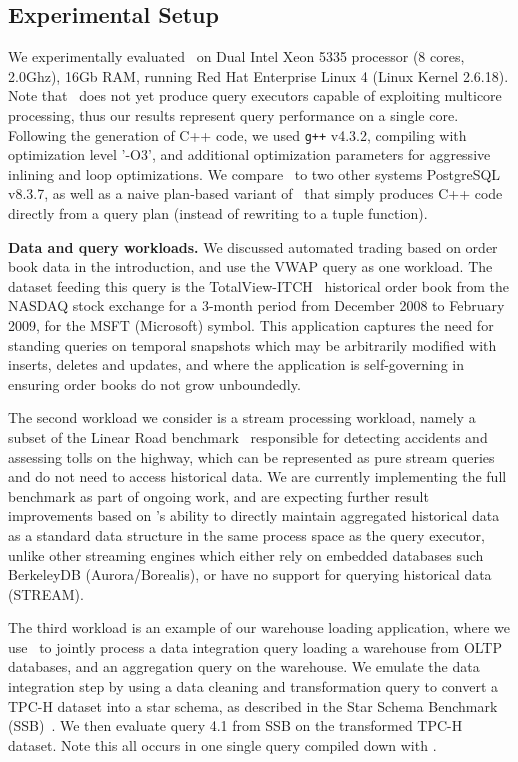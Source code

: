 \subsection{Experimental Setup}
We experimentally evaluated \compiler\ on Dual Intel Xeon 5335 processor (8
cores, 2.0Ghz), 16Gb RAM, running Red Hat Enterprise Linux 4 (Linux Kernel
2.6.18). Note that \compiler\ does not yet produce query executors capable of
exploiting multicore processing, thus our results represent query performance on
a single core. Following the generation of C++ code, we used \texttt{g++} v4.3.2,
compiling with optimization level '-O3', and additional optimization parameters
for aggressive inlining and loop optimizations. We compare \compiler\ to two
other systems PostgreSQL v8.3.7, as well as a naive plan-based variant of
\compiler\ that simply produces C++ code directly from a query plan (instead of
rewriting to a tuple function).

\textbf{Data and query workloads.}
We discussed automated trading based on order book data in the introduction, and
use the VWAP query as one workload. The dataset feeding this query is the
TotalView-ITCH~\cite{totalview-url} historical order book from the NASDAQ stock
exchange for a 3-month period from December 2008 to February 2009, for the MSFT
(Microsoft) symbol. This application captures the need for standing queries on
temporal snapshots which may be arbitrarily modified with inserts, deletes and
updates, and where the application is self-governing in ensuring order books do
not grow unboundedly.

The second workload we consider is a stream processing workload, namely a subset
of the Linear Road benchmark~\cite{arasu-vldb:04} responsible for detecting
accidents and assessing tolls on the highway, which can be represented as pure
stream queries and do not need to access historical data. We are currently
implementing the full benchmark as part of ongoing work, and are expecting
further result improvements based on \compiler's ability to directly maintain
aggregated historical data as a standard data structure in the same process space
as the query executor, unlike other streaming engines which either rely on
embedded databases such BerkeleyDB (Aurora/Borealis), or have no support for
querying historical data (STREAM).

The third workload is an example of our warehouse loading application, where we
use \compiler\ to jointly process a data integration query loading a warehouse
from OLTP databases, and an aggregation query on the warehouse. We emulate the
data integration step by using a data cleaning and transformation query to
convert a TPC-H dataset into a star schema, as described in the Star Schema
Benchmark (SSB)~\cite{poneil-ssb:07}. We then evaluate query 4.1 from SSB on the
transformed TPC-H dataset. Note this all occurs in one single query compiled down
with \compiler.


